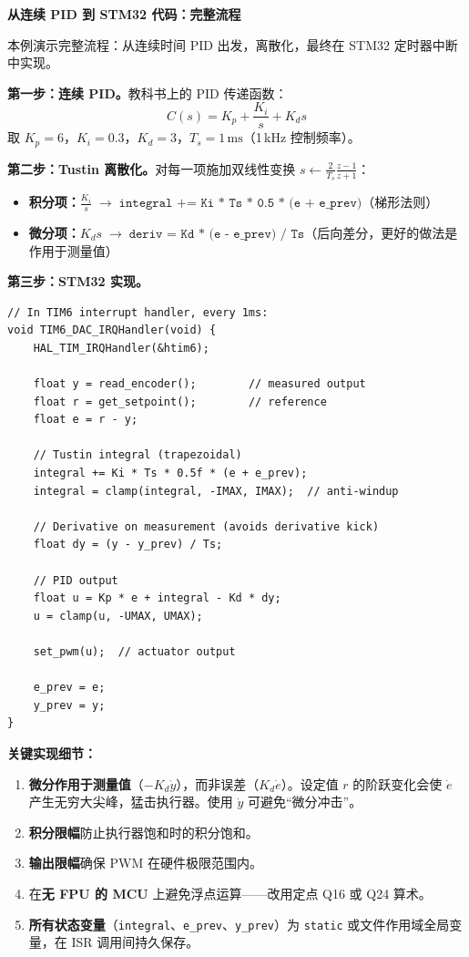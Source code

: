 \begin{mdframed}[linewidth=1pt, innertopmargin=10pt, innerbottommargin=10pt]
\textbf{从连续 PID 到 STM32 代码：完整流程}

\vspace{0.3em}
本例演示完整流程：从连续时间 PID 出发，离散化，最终在 STM32 定时器中断中实现。

\textbf{第一步：连续 PID。}教科书上的 PID 传递函数：
\[
C(s) = K_p + \frac{K_i}{s} + K_d s
\]
取 $K_p = 6$，$K_i = 0.3$，$K_d = 3$，$T_s = 1\,\text{ms}$（1\,kHz 控制频率）。

\textbf{第二步：Tustin 离散化。}对每一项施加双线性变换 $s \leftarrow \frac{2}{T_s}\frac{z-1}{z+1}$：
\begin{itemize}[nosep]
    \item \textbf{积分项：}$\frac{K_i}{s} \;\to\; \texttt{integral += Ki * Ts * 0.5 * (e + e\_prev)}$（梯形法则）
    \item \textbf{微分项：}$K_d s \;\to\; \texttt{deriv = Kd * (e - e\_prev) / Ts}$（后向差分，更好的做法是作用于测量值）
\end{itemize}

\textbf{第三步：STM32 实现。}
\begin{verbatim}
// In TIM6 interrupt handler, every 1ms:
void TIM6_DAC_IRQHandler(void) {
    HAL_TIM_IRQHandler(&htim6);

    float y = read_encoder();        // measured output
    float r = get_setpoint();        // reference
    float e = r - y;

    // Tustin integral (trapezoidal)
    integral += Ki * Ts * 0.5f * (e + e_prev);
    integral = clamp(integral, -IMAX, IMAX);  // anti-windup

    // Derivative on measurement (avoids derivative kick)
    float dy = (y - y_prev) / Ts;

    // PID output
    float u = Kp * e + integral - Kd * dy;
    u = clamp(u, -UMAX, UMAX);

    set_pwm(u);  // actuator output

    e_prev = e;
    y_prev = y;
}
\end{verbatim}

\textbf{关键实现细节：}
\begin{enumerate}[nosep]
    \item \textbf{微分作用于测量值}（$-K_d \dot{y}$），而非误差（$K_d \dot{e}$）。设定值 $r$ 的阶跃变化会使 $\dot{e}$ 产生无穷大尖峰，猛击执行器。使用 $\dot{y}$ 可避免``微分冲击''。
    \item \textbf{积分限幅}防止执行器饱和时的积分饱和。
    \item \textbf{输出限幅}确保 PWM 在硬件极限范围内。
    \item 在\textbf{无 FPU 的 MCU} 上避免浮点运算——改用定点 Q16 或 Q24 算术。
    \item \textbf{所有状态变量}（\texttt{integral}、\texttt{e\_prev}、\texttt{y\_prev}）为 \texttt{static} 或文件作用域全局变量，在 ISR 调用间持久保存。
\end{enumerate}
\end{mdframed}
